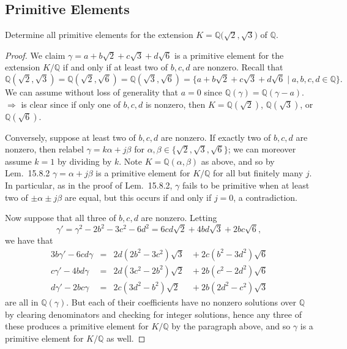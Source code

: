 \documentclass[12pt]{article}
\theoremstyle{remark}
\begin{document}
\subsection{Primitive Elements}
\setcounter{subsubsection}{1}
\begin{problem}
  Determine all primitive elements for the extension $K = \mathbb{Q} (\sqrt{2},$$\sqrt{3})$ of $\mathbb{Q}$.
\end{problem}
\begin{proof}
  We claim $\gamma = a + b\sqrt{2} + c\sqrt{3} + d\sqrt{6}$ is a primitive element for the extension $K/\mathbb{Q}$ if and only if at least two of $b,c,d$ are nonzero. Recall that
  \begin{equation*}
    \mathbb{Q}(\sqrt{2},\sqrt{3}) = \mathbb{Q}(\sqrt{2},\sqrt{6}) = \mathbb{Q}(\sqrt{3},\sqrt{6}) = \{a+b\sqrt{2}+c\sqrt{3}+d\sqrt{6} \mid a,b,c,d\in \mathbb{Q}\}.
  \end{equation*}
  We can assume without loss of generality that $a=0$ since $\mathbb{Q}(\gamma) = \mathbb{Q}(\gamma-a)$. $\Rightarrow$ is clear since if only one of $b,c,d$ is nonzero, then $K = \mathbb{Q}(\sqrt{2})$, $\mathbb{Q}(\sqrt{3})$, or $\mathbb{Q}(\sqrt{6})$.
  \par Conversely, suppose at least two of $b,c,d$ are nonzero. If exactly two of $b,c,d$ are nonzero, then relabel $\gamma = k\alpha + j\beta$ for $\alpha,\beta \in \{\sqrt{2},\sqrt{3},\sqrt{6}\}$; we can moreover assume $k=1$ by dividing by $k$. Note $K = \mathbb{Q}(\alpha,\beta)$ as above, and so by Lem.~15.8.2 $\gamma = \alpha + j\beta$ is a primitive element for $K/\mathbb{Q}$ for all but finitely many $j$. In particular, as in the proof of Lem.~15.8.2, $\gamma$ fails to be primitive when at least two of $\pm\alpha \pm j\beta$ are equal, but  this occurs if and only if $j=0$, a contradiction.
  \par Now suppose that all three of $b,c,d$ are nonzero. Letting 
  \begin{equation*}
    \gamma' = \gamma^2-2b^2-3c^2-6d^2 = 6cd\sqrt{2} + 4bd\sqrt{3} + 2bc\sqrt{6},
  \end{equation*}
  we have that
  \begin{alignat*}{3}
    b\gamma' - 6cd\gamma &={}& 2d(2b^2-3c^2)\sqrt{3} &{}+ 2c(b^2-3d^2)\sqrt{6}\\
    c\gamma' - 4bd\gamma &={}& 2d(3c^2-2b^2)\sqrt{2} &{}+ 2b(c^2-2d^2)\sqrt{6}\\
    d\gamma' - 2bc\gamma &={}& 2c(3d^2-b^2)\sqrt{2} &{}+ 2b(2d^2-c^2)\sqrt{3}
  \end{alignat*}
  are all in $\mathbb{Q}(\gamma)$. But each of their coefficients have no nonzero solutions over $\mathbb{Q}$ by clearing denominators and checking for integer solutions, hence any three of these produces a primitive element for $K/\mathbb{Q}$ by the paragraph above, and so $\gamma$ is a primitive element for $K/\mathbb{Q}$ as well.
\end{proof}
\end{document}
